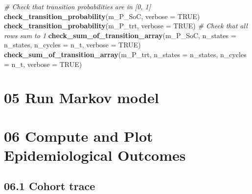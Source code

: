 \documentclass[]{article}
\newenvironment{Shaded}{\begin{snugshade}}{\end{snugshade}}
\newcommand{\KeywordTok}[1]{\textcolor[rgb]{0.13,0.29,0.53}{\textbf{#1}}}
\newcommand{\DataTypeTok}[1]{\textcolor[rgb]{0.13,0.29,0.53}{#1}}
\newcommand{\DecValTok}[1]{\textcolor[rgb]{0.00,0.00,0.81}{#1}}
\newcommand{\StringTok}[1]{\textcolor[rgb]{0.31,0.60,0.02}{#1}}
\newcommand{\CommentTok}[1]{\textcolor[rgb]{0.56,0.35,0.01}{\textit{#1}}}
\newcommand{\OtherTok}[1]{\textcolor[rgb]{0.56,0.35,0.01}{#1}}
\newcommand{\ControlFlowTok}[1]{\textcolor[rgb]{0.13,0.29,0.53}{\textbf{#1}}}
\newcommand{\OperatorTok}[1]{\textcolor[rgb]{0.81,0.36,0.00}{\textbf{#1}}}
\newcommand{\NormalTok}[1]{#1}
\begin{document}
\begin{Shaded}
\begin{Highlighting}[]
\CommentTok{# Check that transition probabilities are in [0, 1]}
\KeywordTok{check_transition_probability}\NormalTok{(m_P_SoC, }\DataTypeTok{verbose =} \OtherTok{TRUE}\NormalTok{)}
\KeywordTok{check_transition_probability}\NormalTok{(m_P_trt, }\DataTypeTok{verbose =} \OtherTok{TRUE}\NormalTok{)}
\CommentTok{# Check that all rows sum to 1}
\KeywordTok{check_sum_of_transition_array}\NormalTok{(m_P_SoC, }\DataTypeTok{n_states =}\NormalTok{ n_states, }\DataTypeTok{n_cycles =}\NormalTok{ n_t, }\DataTypeTok{verbose =} \OtherTok{TRUE}\NormalTok{)}
\KeywordTok{check_sum_of_transition_array}\NormalTok{(m_P_trt, }\DataTypeTok{n_states =}\NormalTok{ n_states, }\DataTypeTok{n_cycles =}\NormalTok{ n_t, }\DataTypeTok{verbose =} \OtherTok{TRUE}\NormalTok{)}
\end{Highlighting}
\end{Shaded}

\section{05 Run Markov model}\label{run-markov-model}

\begin{Shaded}
\end{Shaded}

\section{06 Compute and Plot Epidemiological
Outcomes}\label{compute-and-plot-epidemiological-outcomes}

\subsection{06.1 Cohort trace}\label{cohort-trace-1}
\end{document}
